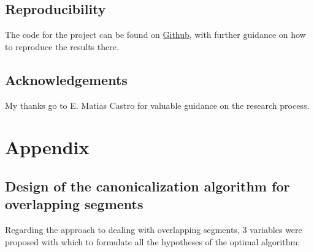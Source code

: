 \documentclass[   ]{article}
\begin{document}
\subsection*{Reproducibility}
The code for the project can be found on \href{https://github.com/PipeVerri/Canonicalization}{Github}, with further guidance on how to reproduce the results there.

\subsection*{Acknowledgements}
My thanks go to E. Matias Castro for valuable guidance on the research process.




\appendix
\section{Appendix}

\subsection{Design of the canonicalization algorithm for overlapping segments}\label{sec:design-of-the-canonicalization-algorithm}
Regarding the approach to dealing with overlapping segments, 3 variables were proposed with which to formulate all the
hypotheses of the optimal algorithm: 
\end{document}
